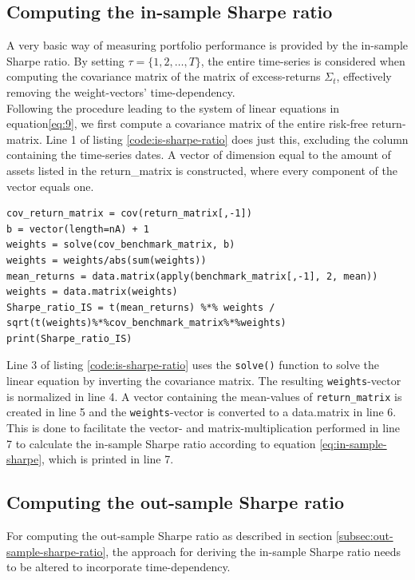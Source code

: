 \subsection{Computing the in-sample Sharpe ratio}
A very basic way of measuring portfolio performance is provided by the in-sample Sharpe ratio. By setting $\tau = \lbrace 1, 2, \dots, T \rbrace$, the entire time-series is considered when computing the covariance matrix of the matrix of excess-returns $\Sigma_t$, effectively removing the weight-vectors' time-dependency. \\

Following the procedure leading to the system of linear equations in equation\ref{eq:9}, we first compute a covariance matrix of the entire risk-free return-matrix. Line 1 of listing \ref{code:is-sharpe-ratio} does just this, excluding the column containing the time-series dates. A vector of dimension equal to the amount of assets listed in the return\_matrix is constructed, where every component of the vector equals one.\\

\begin{lstlisting}[caption={This example shows how the in-sample Sharpe ratio for a matrix of expected returns, computed in the R programming language.}, label=code:is-sharpe-ratio, frame=single]
cov_return_matrix = cov(return_matrix[,-1])
b = vector(length=nA) + 1
weights = solve(cov_benchmark_matrix, b)
weights = weights/abs(sum(weights))
mean_returns = data.matrix(apply(benchmark_matrix[,-1], 2, mean))
weights = data.matrix(weights)
Sharpe_ratio_IS = t(mean_returns) %*% weights / sqrt(t(weights)%*%cov_benchmark_matrix%*%weights)
print(Sharpe_ratio_IS)
\end{lstlisting}

Line 3 of listing \ref{code:is-sharpe-ratio} uses the \lstinline|solve()| function to solve the linear equation by inverting the covariance matrix. The resulting \lstinline|weights|-vector is normalized in line 4. A vector containing the mean-values of \lstinline|return_matrix| is created in line 5 and the \lstinline|weights|-vector is converted to a data.matrix in line 6. This is done to facilitate the vector- and matrix-multiplication performed in line 7 to calculate the in-sample Sharpe ratio according to equation \ref{eq:in-sample-sharpe}, which is printed in line 7.\\

\subsection{Computing the out-sample Sharpe ratio} \label{subsec:minVar-out-sample-sharpe}
For computing the out-sample Sharpe ratio as described in section \ref{subsec:out-sample-sharpe-ratio}, the approach for deriving the in-sample Sharpe ratio needs to be altered to incorporate time-dependency. \\

